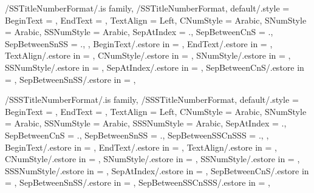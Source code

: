 \pgfkeys
{
  /SSTitleNumberFormat/.is family, /SSTitleNumberFormat,
  default/.style =
  {
    BeginText = \empty,
    EndText = \empty,
    TextAlign = {Left},
    CNumStyle = Arabic,
    SNumStyle = Arabic,
    SSNumStyle = Arabic,
    SepAtIndex = {.}, %
    SepBetweenCnS = {.}, %
    SepBetweenSnSS = {.}, %
  },
  BeginText/.estore in = \GetSSTitleNumberFormatBeginText,
  EndText/.estore in = \GetSSTitleNumberFormatEndText,
  TextAlign/.estore in = \GetSSTitleNumberFormatTextAlign,
  CNumStyle/.estore in = \GetSSTitleNumberFormatCNumStyle,
  SNumStyle/.estore in = \GetSSTitleNumberFormatSNumStyle,
  SSNumStyle/.estore in = \GetSSTitleNumberFormatSSNumStyle,
  SepAtIndex/.estore in = \GetSSTitleNumberFormatSepAtIndex,
  SepBetweenCnS/.estore in = \GetSSTitleNumberFormatSepBetweenCnS,
  SepBetweenSnSS/.estore in = \GetSSTitleNumberFormatSepBetweenSnSS,
} %

\newcommand\GetSubSectionTitleNumberFormatString{}
\newcommand\SetupSubSectionTitleNumberFormatString
{%
  \SetupTitleNumberFormatString{SubSection}%
  {%
    BeginText=\GetSSTitleNumberFormatBeginText,%
    EndText=\GetSSTitleNumberFormatEndText,%
    CNumStyle=\GetSSTitleNumberFormatCNumStyle,%
    SNumStyle=\GetSSTitleNumberFormatSNumStyle,%
    SSNumStyle=\GetSSTitleNumberFormatSSNumStyle,%
    SepAtIndex=\GetSSTitleNumberFormatSepAtIndex,%
    SepBetweenCnS=\GetSSTitleNumberFormatSepBetweenCnS,%
    SepBetweenSnSS=\GetSSTitleNumberFormatSepBetweenSnSS,%
    CCounterName=chapter,%
    SCounterName=section,%
    SSCounterName=subsection,%
  }{\GetSubSectionTitleNumberFormatString}%
} %


\pgfkeys
{
  /SSSTitleNumberFormat/.is family, /SSSTitleNumberFormat,
  default/.style =
  {
    BeginText = \empty,
    EndText = \empty,
    TextAlign = {Left},
    CNumStyle = Arabic,
    SNumStyle = Arabic,
    SSNumStyle = Arabic,
    SSSNumStyle = Arabic,
    SepAtIndex = {.}, %
    SepBetweenCnS = {.}, %
    SepBetweenSnSS = {.}, %
    SepBetweenSSCnSSS = {.}, %
  },
  BeginText/.estore in = \GetSSSTitleNumberFormatBeginText,
  EndText/.estore in = \GetSSSTitleNumberFormatEndText,
  TextAlign/.estore in = \GetSSSTitleNumberFormatTextAlign,
  CNumStyle/.estore in = \GetSSSTitleNumberFormatCNumStyle,
  SNumStyle/.estore in = \GetSSSTitleNumberFormatSNumStyle,
  SSNumStyle/.estore in = \GetSSSTitleNumberFormatSSNumStyle,
  SSSNumStyle/.estore in = \GetSSSTitleNumberFormatSSSNumStyle,
  SepAtIndex/.estore in = \GetSSSTitleNumberFormatSepAtIndex,
  SepBetweenCnS/.estore in = \GetSSSTitleNumberFormatSepBetweenCnS,
  SepBetweenSnSS/.estore in = \GetSSSTitleNumberFormatSepBetweenSnSS,
  SepBetweenSSCnSSS/.estore in = \GetSSSTitleNumberFormatSepBetweenSSCnSSS,
} %

